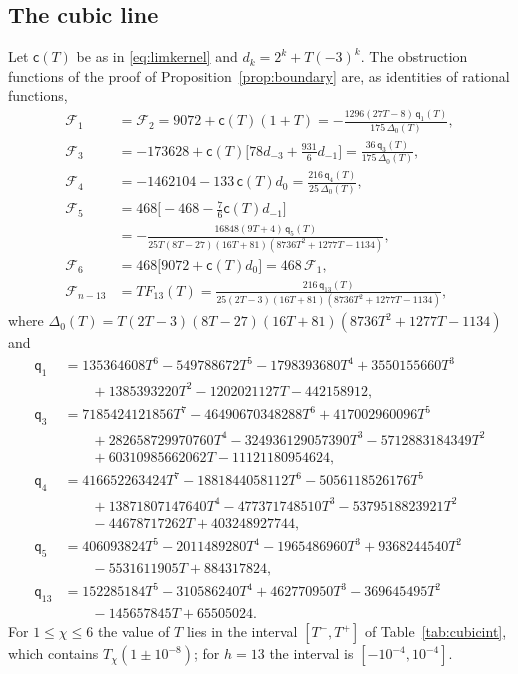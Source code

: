 \documentclass{amsart}
\theoremstyle{definition}
\theoremstyle{remark}
\numberwithin{equation}{section}
\begin{document}
\subsection*{The cubic line}
Let $\mathsf c(T)$ be as in \eqref{eq:limkernel} and $d_k=2^k+T(-3)^k$. The obstruction
functions of the proof of Proposition~\ref{prop:boundary} are, as identities of rational
functions,
\begin{align*}
  \mathcal F_1&=\mathcal F_2=9072+\mathsf c(T)(1+T)
   =-\frac{1296(27T-8)\,\mathsf q_1(T)}{175\,\Delta_0(T)},\\
  \mathcal F_3&=-173628+\mathsf c(T)\bigl[78d_{-3}+\tfrac{931}6d_{-1}\bigr]
   =\frac{36\,\mathsf q_3(T)}{175\,\Delta_0(T)},\\
  \mathcal F_4&=-1462104-133\,\mathsf c(T)d_0=\frac{216\,\mathsf q_4(T)}{25\,\Delta_0(T)},\\
  \mathcal F_5&=468\bigl[-468-\tfrac76\mathsf c(T)d_{-1}\bigr]\\
   &=-\frac{16848(9T+4)\,\mathsf q_5(T)}{25T(8T-27)(16T+81)(8736T^2+1277T-1134)},\\
  \mathcal F_6&=468\bigl[9072+\mathsf c(T)d_0\bigr]=468\,\mathcal F_1,\\
  \mathcal F_{n-13}&=TF_{13}(T)=\frac{216\,\mathsf q_{13}(T)}{25(2T-3)(16T+81)(8736T^2+1277T-1134)},
\end{align*}
where $\Delta_0(T)=T(2T-3)(8T-27)(16T+81)(8736T^2+1277T-1134)$ and
\begin{align*}
  \mathsf q_1&=135364608T^6-549788672T^5-1798393680T^4+3550155660T^3\\
   &\qquad+1385393220T^2-1202021127T-442158912,\\
  \mathsf q_3&=7185424121856T^7-46490670348288T^6+417002960096T^5\\
   &\qquad+282658729970760T^4-324936129057390T^3-5712883184349T^2\\
   &\qquad+60310985662062T-11121180954624,\\
  \mathsf q_4&=416652263424T^7-1881844058112T^6-5056118526176T^5\\
   &\qquad+13871807147640T^4-477371748510T^3-5379518823921T^2\\
   &\qquad-44678717262T+403248927744,\\
  \mathsf q_5&=406093824T^5-2011489280T^4-1965486960T^3+9368244540T^2\\
   &\qquad-5531611905T+884317824,\\
  \mathsf q_{13}&=152285184T^5-310586240T^4+462770950T^3-369645495T^2\\
   &\qquad-145657845T+65505024 .
\end{align*}
For $1\le\chi\le6$ the value of $T$ lies in the interval $[T^-,T^+]$ of
Table~\ref{tab:cubicint}, which contains $T_\chi(1\pm10^{-8})$; for $h=13$ the interval is
$[-10^{-4},10^{-4}]$.
\end{document}
